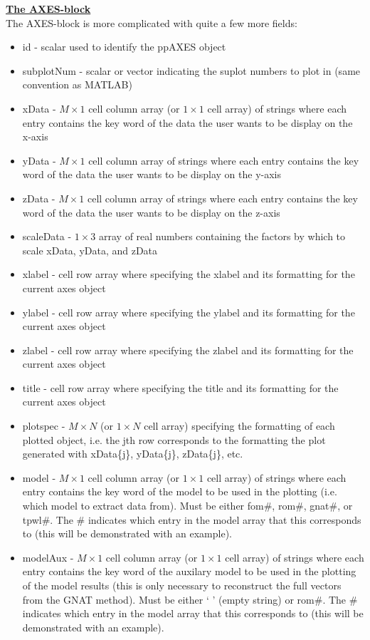 \documentclass[notitlepage]{report}
\begin{document}
\vspace{2mm}
\noindent \underline{\textbf{The AXES-block}} \\
The AXES-block is more complicated with quite a few more fields:
\begin{itemize}
    \item id - scalar used to identify the ppAXES object
      \item subplotNum - scalar or vector indicating the suplot numbers to plot in (same convention as MATLAB)
      \item xData - $M \times 1$ cell column array (or $1 \times 1$ cell array) of strings where each entry contains the key word of the data the user wants to be display on the x-axis
      \item yData - $M \times 1$ cell column array of strings where each entry contains the key word of the data the user wants to be display on the y-axis
      \item zData - $M \times 1$ cell column array of strings where each entry contains the key word of the data the user wants to be display on the z-axis
      \item scaleData - $1 \times 3$ array of real numbers containing the factors by which to scale xData, yData, and zData
      \item xlabel - cell row array where specifying the xlabel and its formatting for the current axes object 
      \item ylabel - cell row array where specifying the ylabel and its formatting for the current axes object
      \item zlabel  - cell row array where specifying the zlabel and its formatting for the current axes object
      \item title - cell row array where specifying the title and its formatting for the current axes object 
      \item plotspec - $M \times N$ (or $1 \times N$ cell array) specifying the formatting of each plotted object, i.e. the jth row corresponds to the formatting the plot generated with xData\{j\}, yData\{j\}, zData\{j\}, etc.
      \item model - $M \times 1$ cell column array (or $1 \times 1$ cell array) of strings where each entry contains the key word of the model to be used in the plotting (i.e. which model to extract data from).  Must be either fom\#,  rom\#, gnat\#, or tpwl\#.  The \# indicates which entry in the model array that this corresponds to (this will be demonstrated with an example).
      \item modelAux - $M \times 1$ cell column array (or $1 \times 1$ cell array) of strings where each entry contains the key word of the auxilary model to be used in the plotting of the model results (this is only necessary to reconstruct the full vectors from the GNAT method).  Must be either ` ' (empty string) or rom\#. The \# indicates which entry in the model array that this corresponds to (this will be demonstrated with an example).

\end{itemize}
\end{document}

